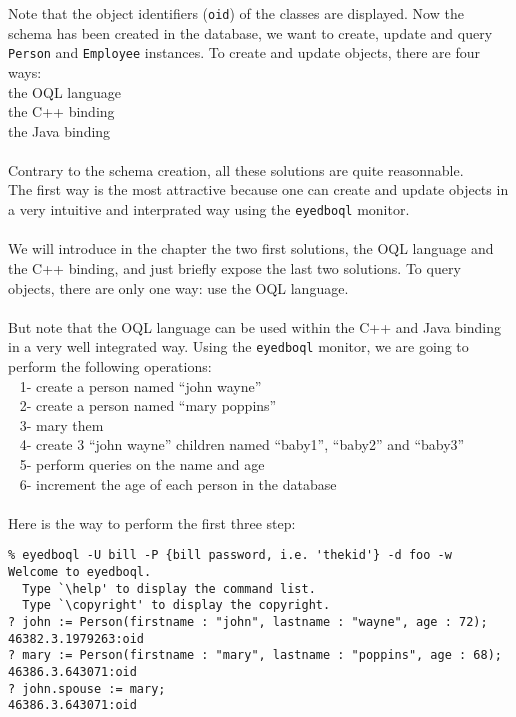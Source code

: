 Note that the object identifiers (\texttt{oid}) of the classes are displayed.
Now the schema has been created in the database, we want to create, update
and query \texttt{Person} and \texttt{Employee} instances.
To create and update objects, there are four ways:\\
\idt the OQL language\\
\idt the C++ binding\\
\idt the Java binding\\
\\
Contrary to the schema creation, all these solutions are quite reasonnable.
\\
The first way is the most attractive because one can create and update objects
in a very intuitive and interprated way using the \texttt{eyedboql} monitor.
\\
\\
We will introduce in the chapter the two first solutions, the OQL language 
and the C++ binding, and just briefly expose the last two solutions.
To query objects, there are only one way: use the OQL language.\\
\\
But note that the OQL language can be used within the C++ and Java binding
in a very well integrated way.
Using the \texttt{eyedboql} monitor, we are going to perform the following
operations:\\
\mbox{ } 1- create a person named ``john wayne''\\
\mbox{ } 2- create a person named ``mary poppins''\\
\mbox{ } 3- mary them\\
\mbox{ } 4- create 3 ``john wayne'' children named ``baby1'', ``baby2'' and
``baby3''\\
\mbox{ } 5- perform queries on the name and age\\
\mbox{ } 6- increment the age of each person in the database\\
\\
Here is the way to perform the first three step:
\verbsize \begin{verbatim}
% eyedboql -U bill -P {bill password, i.e. 'thekid'} -d foo -w
Welcome to eyedboql.
  Type `\help' to display the command list.
  Type `\copyright' to display the copyright.
? john := Person(firstname : "john", lastname : "wayne", age : 72);
46382.3.1979263:oid
? mary := Person(firstname : "mary", lastname : "poppins", age : 68);
46386.3.643071:oid
? john.spouse := mary;
46386.3.643071:oid
\end{verbatim}
